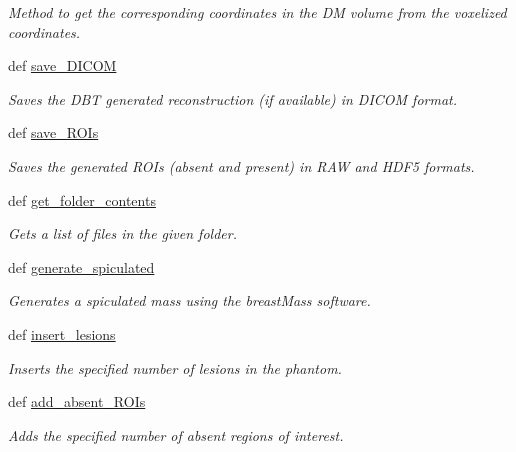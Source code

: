 \begin{DoxyCompactItemize}
\begin{DoxyCompactList}\small\item\em Method to get the corresponding coordinates in the D\-M volume from the voxelized coordinates. \end{DoxyCompactList}\item 
def \hyperlink{classVictre_1_1Pipeline_1_1Pipeline_a38cf3bb515b5c52d4010867bc3dfc1d0}{save\-\_\-\-D\-I\-C\-O\-M}
\begin{DoxyCompactList}\small\item\em Saves the D\-B\-T generated reconstruction (if available) in D\-I\-C\-O\-M format. \end{DoxyCompactList}\item 
def \hyperlink{classVictre_1_1Pipeline_1_1Pipeline_ab41af48a6a0860907671a80d4d1fffd6}{save\-\_\-\-R\-O\-Is}
\begin{DoxyCompactList}\small\item\em Saves the generated R\-O\-Is (absent and present) in R\-A\-W and H\-D\-F5 formats. \end{DoxyCompactList}\item 
def \hyperlink{classVictre_1_1Pipeline_1_1Pipeline_ae6bc9a133eb885f8aa605ff80fc7f784}{get\-\_\-folder\-\_\-contents}
\begin{DoxyCompactList}\small\item\em Gets a list of files in the given folder. \end{DoxyCompactList}\item 
def \hyperlink{classVictre_1_1Pipeline_1_1Pipeline_aa63a440812d2bbeec712e6c4f9054f1d}{generate\-\_\-spiculated}
\begin{DoxyCompactList}\small\item\em Generates a spiculated mass using the breast\-Mass software. \end{DoxyCompactList}\item 
def \hyperlink{classVictre_1_1Pipeline_1_1Pipeline_aab8f3f01f7247868aecd5bac81323263}{insert\-\_\-lesions}
\begin{DoxyCompactList}\small\item\em Inserts the specified number of lesions in the phantom. \end{DoxyCompactList}\item 
def \hyperlink{classVictre_1_1Pipeline_1_1Pipeline_a6ed9f1e6df840d9a5753860de0312272}{add\-\_\-absent\-\_\-\-R\-O\-Is}
\begin{DoxyCompactList}\small\item\em Adds the specified number of absent regions of interest. \end{DoxyCompactList}\end{DoxyCompactItemize}
